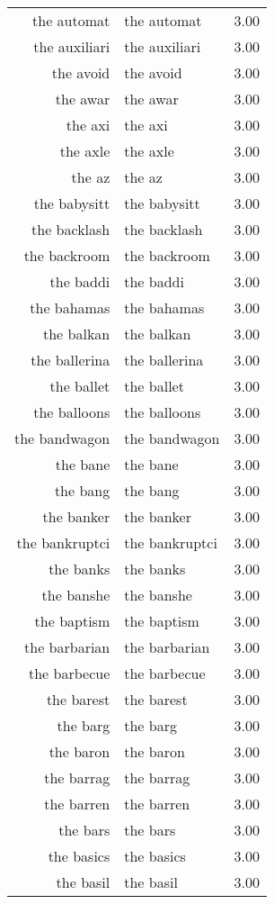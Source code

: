 \begin{table}[ht]
\begin{tabular}{rlr}
  the automat & the automat & 3.00 \\ 
  the auxiliari & the auxiliari & 3.00 \\ 
  the avoid & the avoid & 3.00 \\ 
  the awar & the awar & 3.00 \\ 
  the axi & the axi & 3.00 \\ 
  the axle & the axle & 3.00 \\ 
  the az & the az & 3.00 \\ 
  the babysitt & the babysitt & 3.00 \\ 
  the backlash & the backlash & 3.00 \\ 
  the backroom & the backroom & 3.00 \\ 
  the baddi & the baddi & 3.00 \\ 
  the bahamas & the bahamas & 3.00 \\ 
  the balkan & the balkan & 3.00 \\ 
  the ballerina & the ballerina & 3.00 \\ 
  the ballet & the ballet & 3.00 \\ 
  the balloons & the balloons & 3.00 \\ 
  the bandwagon & the bandwagon & 3.00 \\ 
  the bane & the bane & 3.00 \\ 
  the bang & the bang & 3.00 \\ 
  the banker & the banker & 3.00 \\ 
  the bankruptci & the bankruptci & 3.00 \\ 
  the banks & the banks & 3.00 \\ 
  the banshe & the banshe & 3.00 \\ 
  the baptism & the baptism & 3.00 \\ 
  the barbarian & the barbarian & 3.00 \\ 
  the barbecue & the barbecue & 3.00 \\ 
  the barest & the barest & 3.00 \\ 
  the barg & the barg & 3.00 \\ 
  the baron & the baron & 3.00 \\ 
  the barrag & the barrag & 3.00 \\ 
  the barren & the barren & 3.00 \\ 
  the bars & the bars & 3.00 \\ 
  the basics & the basics & 3.00 \\ 
  the basil & the basil & 3.00 \\ 

\end{tabular}
\end{table}
